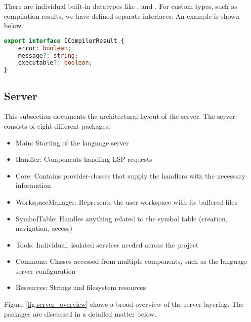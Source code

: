 There are individual built-in datatypes like ,  and  \cite{ts-types}.
For custom types, such as compilation results, we have defined separate interfaces.
An example is shown below.



\begin{lstlisting}[language=typescript, caption={Type Interface Supplementing \code{any}-types}, captionpos=b, label={lst:typeinterface}]
export interface ICompilerResult {
    error: boolean;
    message?: string;
    executable?: boolean;
}
\end{lstlisting}






\subsection{Server}
This subsection documents the architectural layout of the server.
The server consists of eight different packages:
\begin{itemize}
    \item Main: Starting of the language server
    \item Handler: Components handling LSP requests
    \item Core: Contains provider-classes that supply the handlers with the necessary information
    \item WorkspaceManager: Represents the user workspace with its buffered files
    \item SymbolTable: Handles anything related to the symbol table (creation, navigation, access)
    \item Tools: Individual, isolated services needed across the project
    \item Commons: Classes accessed from multiple components, such as the language server configuration
    \item Resources: Strings and filesystem resources
\end{itemize}

Figure \ref{fig:server_overview} shows a broad overview of the server layering.
The packages are discussed in a detailed matter below.

